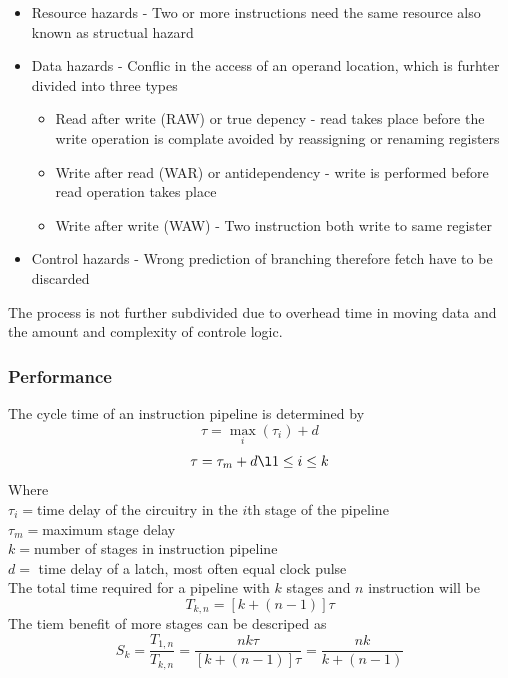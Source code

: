 \documentclass[12pt, a4paper]{article}
\begin{document}
			\begin{itemize}	
				\item Resource hazards - Two or more instructions need the same resource also known as structual hazard
				\item Data hazards - Conflic in the access of an operand location, which is furhter divided into three types
				\begin{itemize}
					\item Read after write (RAW) or true depency - read takes place before the write operation is complate avoided by reassigning or renaming registers
					\item Write after read (WAR) or antidependency - write is performed before read operation takes place
					\item Write after write (WAW) - Two instruction both write to same register
				\end{itemize}
				\item Control hazards - Wrong prediction of branching therefore fetch have to be discarded
			\end{itemize}
			
			The process is not further subdivided due to overhead time in moving data and the amount and complexity of controle logic.\\
			\subsubsection{Performance}
				The cycle time of an instruction pipeline is determined by
				$$\tau = \max_i(\tau_i)+d$$
				$$\tau = \tau_m+d\l1\leq i \leq k$$
				Where\\
				$\tau_i=$time delay of the circuitry in the $i$th stage of the pipeline\\
				$\tau_m=$maximum stage delay\\
				$k=$number of stages in instruction pipeline\\
				$d=$ time delay of a latch, most often equal clock pulse\\
				The total time required for a pipeline with $k$ stages and $n$ instruction will be 
				$$T_{k,n}=[k+(n-1)]\tau$$
				The tiem benefit of more stages can be descriped as
				$$S_k=\frac{T_{1,n}}{T_{k,n}}=\frac{nk\tau}{[k+(n-1)]\tau}=\frac{nk}{k+(n-1)}$$
\end{document}
